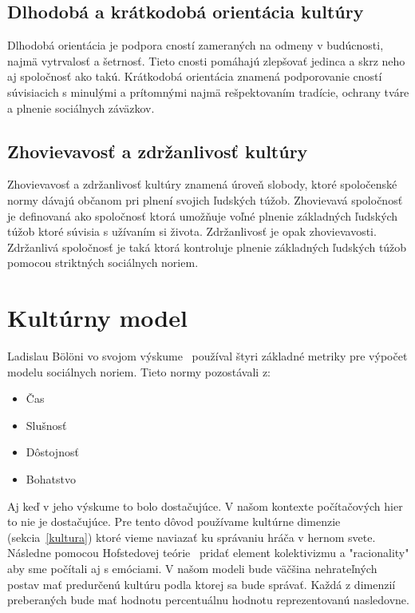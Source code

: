 \documentclass[10pt,twoside,slovak,a4paper]{article}
\begin{document}
\subsection{Dlhodobá a krátkodobá orientácia kultúry}\label{kultura:cnosti}

Dlhodobá orientácia je podpora cností zameraných na odmeny v budúcnosti, najmä vytrvalosť a šetrnosť.
Tieto cnosti pomáhajú zlepšovať jedinca a skrz neho aj spoločnosť ako takú. Krátkodobá orientácia
znamená podporovanie cností súvisiacich s minulými a prítomnými najmä rešpektovaním tradície, ochrany
tváre a plnenie sociálnych záväzkov.

\subsection{Zhovievavosť a zdržanlivosť kultúry}\label{kultura:obmedzenia}

Zhovievavosť a zdržanlivosť kultúry znamená úroveň slobody, ktoré spoločenské normy
dávajú občanom pri plnení svojich ľudských túžob. Zhovievavá spoločnosť je definovaná
ako spoločnosť ktorá umožňuje voľné plnenie základných ľudských túžob ktoré súvisia s
užívaním si života. Zdržanlivosť je opak zhovievavosti. Zdržanlivá spoločnosť je taká
ktorá kontroluje plnenie základných ľudských túžob pomocou striktných sociálnych noriem.

\pagebreak

\section{Kultúrny model}\label{model}

Ladislau B\"{o}l\"{o}ni vo svojom výskume~\cite{computationalmodel2018} používal štyri
základné metriky pre výpočet modelu sociálnych noriem. Tieto normy pozostávali z:

\begin{itemize}
	\item Čas
	\item Slušnosť
	\item Dôstojnosť
	\item Bohatstvo
\end{itemize}

Aj keď v jeho výskume to bolo dostačujúce. V našom kontexte počítačových hier to nie je
dostačujúce. Pre tento dôvod používame kultúrne dimenzie (sekcia~\ref{kultura}) ktoré vieme naviazať
ku správaniu hráča v hernom svete. Následne pomocou Hofstedovej teórie~\cite{hofstede2010cultures}
pridať element kolektivizmu a "racionality" aby sme počítali aj s emóciami. V našom modeli bude väčšina
nehrateľných postav mať predurčenú kultúru podla ktorej sa bude správať. Každá z dimenzií preberaných
bude mať hodnotu percentuálnu hodnotu reprezentovanú nasledovne.
\end{document}
